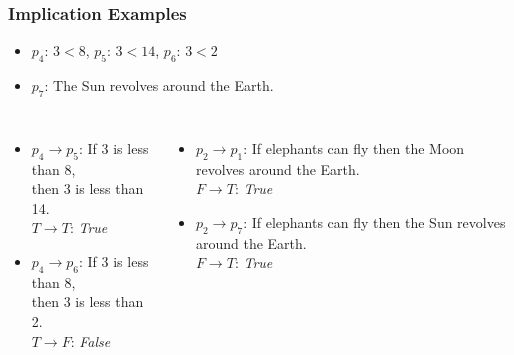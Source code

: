 \documentclass[dvipsnames]{beamer}
\begin{document}
\begin{frame}
  \frametitle{Implication Examples}

  \begin{example}
    \begin{itemize}
      \item $p_4$: $3<8$, $p_5$: $3<14$, $p_6$: $3<2$
      \item $p_7$: The Sun revolves around the Earth.
    \end{itemize}

    \pause
    \begin{columns}[t]
        \begin{itemize}
          \item $p_4 \rightarrow p_5$: If 3 is less than 8,\\
            then 3 is less than 14.\\
            $T \rightarrow T$: \emph{True}
          \pause
          \item $p_4 \rightarrow p_6$: If 3 is less than 8,\\
            then 3 is less than 2.\\
            $T \rightarrow F$: \emph{False}
        \end{itemize}

      \pause
        \begin{itemize}
          \item $p_2 \rightarrow p_1$: If elephants can fly then the Moon
            revolves around the Earth.\\
            $F \rightarrow T$: \emph{True}
          \pause
          \item $p_2 \rightarrow p_7$: If elephants can fly then the Sun
            revolves around the Earth.
            \\
            $F \rightarrow T$: \emph{True}
        \end{itemize}
    \end{columns}
  \end{example}
\end{frame}
\end{document}
